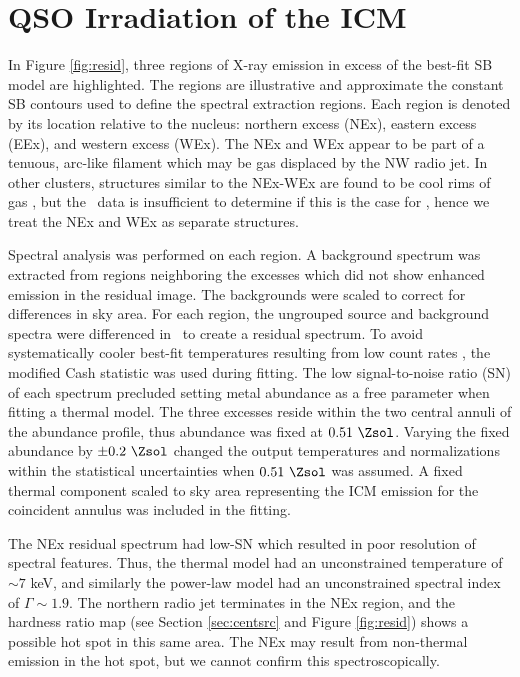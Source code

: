 \documentclass[useAMS,usenatbib]{mn2e}
\begin{document}
\section{QSO Irradiation of the ICM}
\label{sec:excess}

In Figure \ref{fig:resid}, three regions of X-ray emission in excess
of the best-fit SB model are highlighted. The regions are illustrative
and approximate the constant SB contours used to define the spectral
extraction regions. Each region is denoted by its location relative to
the nucleus: northern excess (NEx), eastern excess (EEx), and western
excess (WEx). The NEx and WEx appear to be part of a tenuous, arc-like
filament which may be gas displaced by the NW radio jet. In other
clusters, structures similar to the NEx-WEx are found to be cool rims
of gas \citep[\eg][]{2009ApJ...697L..95B}, but the \chandra\ data is
insufficient to determine if this is the case for \irs, hence we treat
the NEx and WEx as separate structures.

Spectral analysis was performed on each region. A background spectrum
was extracted from regions neighboring the excesses which did not show
enhanced emission in the residual image. The backgrounds were scaled
to correct for differences in sky area. For each region, the ungrouped
source and background spectra were differenced in \xspec\ to create a
residual spectrum. To avoid systematically cooler best-fit
temperatures resulting from low count rates
\citep{1989ApJ...342.1207N}, the modified Cash statistic
\citep{1979ApJ...228..939C} was used during fitting. The low
signal-to-noise ratio (SN) of each spectrum precluded setting metal
abundance as a free parameter when fitting a thermal model. The three
excesses reside within the two central annuli of the abundance
profile, thus abundance was fixed at $0.51 ~\Zsol$. Varying the fixed
abundance by $\pm 0.2 ~\Zsol$ changed the output temperatures and
normalizations within the statistical uncertainties when $0.51 ~\Zsol$
was assumed. A fixed thermal component scaled to sky area representing
the ICM emission for the coincident annulus was included in the
fitting.

The NEx residual spectrum had low-SN which resulted in poor resolution
of spectral features. Thus, the thermal model had an unconstrained
temperature of $\sim 7$ keV, and similarly the power-law model had an
unconstrained spectral index of $\Gamma \sim 1.9$. The northern radio
jet terminates in the NEx region, and the hardness ratio map (see
Section \ref{sec:centsrc} and Figure \ref{fig:resid}) shows a possible
hot spot in this same area. The NEx may result from non-thermal
emission in the hot spot, but we cannot confirm this
spectroscopically.
\end{document}
